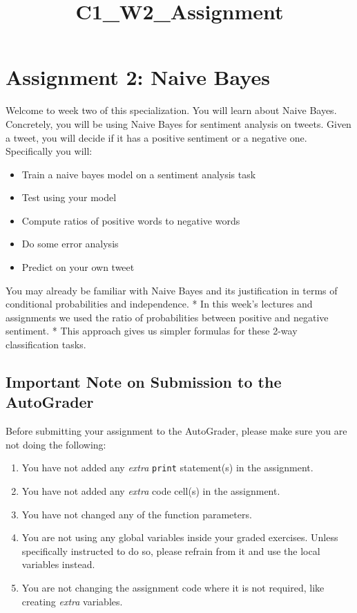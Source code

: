 \documentclass[11pt]{article}
\title{C1\_W2\_Assignment}
\providecommand{\tightlist}{%
      \setlength{\itemsep}{0pt}\setlength{\parskip}{0pt}}
\begin{document}
    
    \maketitle
    
    

    
    \hypertarget{assignment-2-naive-bayes}{%
\section{Assignment 2: Naive Bayes}\label{assignment-2-naive-bayes}}

Welcome to week two of this specialization. You will learn about Naive
Bayes. Concretely, you will be using Naive Bayes for sentiment analysis
on tweets. Given a tweet, you will decide if it has a positive sentiment
or a negative one. Specifically you will:

\begin{itemize}
\tightlist
\item
  Train a naive bayes model on a sentiment analysis task
\item
  Test using your model
\item
  Compute ratios of positive words to negative words
\item
  Do some error analysis
\item
  Predict on your own tweet
\end{itemize}

You may already be familiar with Naive Bayes and its justification in
terms of conditional probabilities and independence. * In this week's
lectures and assignments we used the ratio of probabilities between
positive and negative sentiment. * This approach gives us simpler
formulas for these 2-way classification tasks.

\hypertarget{important-note-on-submission-to-the-autograder}{%
\subsection{Important Note on Submission to the
AutoGrader}\label{important-note-on-submission-to-the-autograder}}

Before submitting your assignment to the AutoGrader, please make sure
you are not doing the following:

\begin{enumerate}
\def\labelenumi{\arabic{enumi}.}
\tightlist
\item
  You have not added any \emph{extra} \texttt{print} statement(s) in the
  assignment.
\item
  You have not added any \emph{extra} code cell(s) in the assignment.
\item
  You have not changed any of the function parameters.
\item
  You are not using any global variables inside your graded exercises.
  Unless specifically instructed to do so, please refrain from it and
  use the local variables instead.
\item
  You are not changing the assignment code where it is not required,
  like creating \emph{extra} variables.
\end{enumerate}
\end{document}

